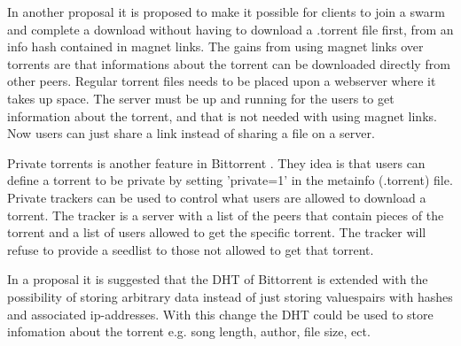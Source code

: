 In another proposal \citep{bittorrent:bep09} it is proposed to make it possible for clients to join a swarm and complete a download without having to download a .torrent file first, from an info hash contained in magnet links. The gains from using magnet links over torrents are that informations about the torrent can be downloaded directly from other peers. Regular torrent files needs to be placed upon a webserver where it takes up space. The server must be up and running for the users to get information about the torrent, and that is not needed with using magnet links.
Now users can just share a link instead of sharing a file on a server.

Private torrents is another feature in Bittorrent \citep{bittorrent:bep27}. They idea is that users can define a torrent to be private by setting 'private=1' in the metainfo (.torrent) file. Private trackers can be used to control what users are allowed to download a torrent. The tracker is a server with a list of the peers that contain pieces of the torrent and a list of users allowed to get the specific torrent.
The tracker will refuse to provide a seedlist to those not allowed to get that torrent.

In a proposal \citep{bittorrent:bep44} it is suggested that the DHT of Bittorrent is extended with the possibility of storing arbitrary data instead of just storing valuespairs with hashes and associated ip-addresses.
With this change the DHT could be used to store infomation about the torrent e.g. song length, author, file size, ect.


